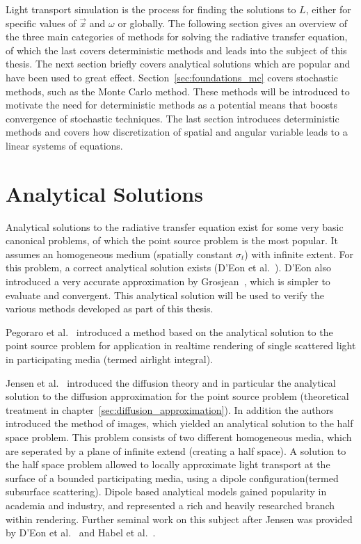 Light transport simulation is the process for finding the solutions to $L$, either for specific values of $\vec{x}$ and $\omega$ or globally. The following section gives an overview of the three main categories of methods for solving the radiative transfer equation, of which the last covers deterministic methods and leads into the subject of this thesis. The next section briefly covers analytical solutions which are popular and have been used to great effect. Section~\ref{sec:foundations_mc} covers stochastic methods, such as the Monte Carlo method. These methods will be introduced to motivate the need for deterministic methods as a potential means that boosts convergence of stochastic techniques. The last section introduces deterministic methods and covers how discretization of spatial and angular variable leads to a linear systems of equations.

\section{Analytical Solutions}
\label{sec:foundations_analytical}

Analytical solutions to the radiative transfer equation exist for some very basic canonical problems, of which the point source problem is the most popular. It assumes an homogeneous medium (spatially constant $\sigma_t$) with infinite extent. For this problem, a correct analytical solution exists (D'Eon et al.~\cite{dEon11}). D'Eon also introduced a very accurate approximation by Grosjean~\cite{Grosjean56}, which is simpler to evaluate and convergent. This analytical solution will be used to verify the various methods developed as part of this thesis.

Pegoraro et al.~\cite{Pegoraro11} introduced a method based on the analytical solution to the point source problem for application in realtime rendering of single scattered light in participating media (termed airlight integral).

Jensen et al.~\cite{Jensen01} introduced the diffusion theory and in particular the analytical solution to the diffusion approximation for the point source problem (theoretical treatment in chapter~\ref{sec:diffusion_approximation}). In addition the authors introduced the method of images, which yielded an analytical solution to the half space problem. This problem consists of two different homogeneous media, which are seperated by a plane of infinite extend (creating a half space). A solution to the half space problem allowed to locally approximate light transport at the surface of a bounded participating media, using a dipole configuration(termed subsurface scattering). Dipole based analytical models gained popularity in academia and industry, and represented a rich and heavily researched branch within rendering. Further seminal work on this subject after Jensen was provided by D'Eon et al.~\cite{dEon11} and Habel et al.~\cite{Habel13}.


